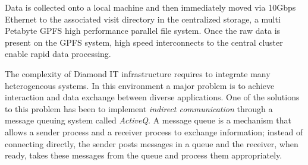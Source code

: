  
 

Data is collected onto a local machine %
and then immediately moved via 10Gbps Ethernet to the associated visit directory in the centralized storage, a multi Petabyte GPFS high performance parallel file system.  Once the raw data is present on the GPFS system, high speed interconnects to the central cluster enable rapid data processing. %

 The complexity of Diamond IT infrastructure requires to integrate many heterogeneous systems. In this environment a major problem is to achieve interaction and data exchange between diverse applications. One of the solutions to this problem has been to implement \emph{indirect communication} through a message queuing system called \emph{ActiveQ}. A message queue is a mechanism
that allows a sender process and a receiver process to exchange information; instead of connecting directly, the sender posts messages in a queue and the receiver, when ready, takes these messages from the queue and process them appropriately. 



